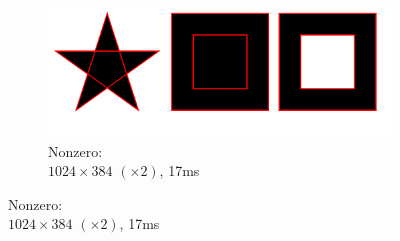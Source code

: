 \documentclass[UTF8]{ctexart}
\begin{document}
\begin{figure}[H]
    \begin{subfigure}[b]{0.4\textwidth}
        \centering
        \includegraphics[width=\textwidth]{images/Nonzero-1024x384-x2-17ms.png}
        \caption{Nonzero: \\$1024 \times 384$ $(\times 2)$, 17ms}
    \end{subfigure}
\end{figure}
\end{document}
